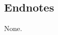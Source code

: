 \documentclass{bmcart}
\begin{document}
\begin{backmatter}
\section*{Endnotes}
  None.







\end{backmatter}
\end{document}
